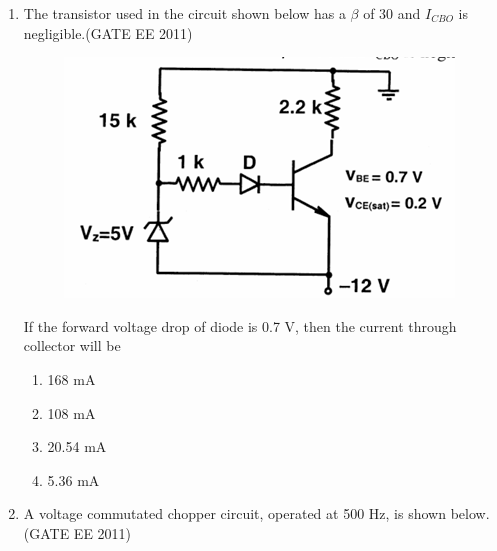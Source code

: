 \documentclass[a4paper,10pt]{exam}
\theoremstyle{remark}
\begin{document}
\begin{enumerate}
\begin{multicols}{2}
\begin{enumerate}
  \item XTHL \\
        INX    D \\
        INX    D \\
        INX    D \\
        XTHL
\end{enumerate}
\end{multicols}




\vfill
\noindent\rule{\textwidth}{0.4pt}
\raggedright{EE-A}
\hfill
9/24
\newpage
\raggedright{2011}
\hfill
{}\\

\noindent\rule{\textwidth}{0.4pt}

\item  The transistor used in the circuit shown below has a $\beta$ of 30 and $I_{CBO}$ is negligible.\hfill{(GATE EE 2011)}
\begin{figure}[H]
    \centering
    \includegraphics[width=0.75\columnwidth]{figs/Q 35.png}\caption{}     \label{fig:myfigure}
\end{figure}
\raggedright{If the forward voltage drop of diode is 0.7 V, then the current through collector will be}
\begin{multicols}{4}
\begin{enumerate}
  \item 168 mA
  \item 108 mA
  \item 20.54 mA
  \item 5.36 mA
\end{enumerate}
\end{multicols}
\item A voltage commutated chopper circuit, operated at 500 Hz, is shown below.\hfill{(GATE EE 2011)}


\end{enumerate}
\end{document}
